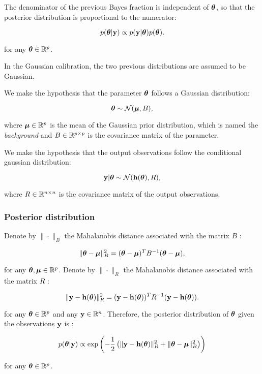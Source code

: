 \documentclass[aspectratio=169]{beamer}
\begin{document}
\begin{frame}

The denominator of the previous Bayes fraction is independent of
$\boldsymbol{\theta}$, so that the posterior distribution is
proportional to the numerator:

$$
p(\boldsymbol{\theta} | {\bf y}) \propto  p({\bf y} | \boldsymbol{\theta}) p(\boldsymbol{\theta}).
$$

for any $\boldsymbol{\theta}\in\mathbb{R}^p$.

\vspace{15pt}

In the Gaussian calibration, the two previous distributions are assumed
to be Gaussian.

We make the hypothesis that the parameter
$\boldsymbol{\theta}$ follows a Gaussian distribution:

$$
\boldsymbol{\theta} \sim \mathcal{N}(\boldsymbol{\mu}, B),
$$

where $\boldsymbol{\mu}\in\mathbb{R}^p$ is the mean of the Gaussian prior
distribution, which is named the \emph{background} and
$B\in\mathbb{R}^{p \times p}$ is the covariance matrix of the
parameter.

\end{frame}

\begin{frame}
We make the hypothesis that the output observations follow the
conditional gaussian distribution:

$$
{\bf y} | \boldsymbol{\theta} \sim \mathcal{N}({\bf h}(\boldsymbol{\theta}), R),
$$

where $R\in\mathbb{R}^{n \times n}$ is the covariance matrix of the
output observations.
\end{frame}


\begin{frame}
\frametitle{Posterior distribution}

Denote by $\|\cdot\|_B$ the Mahalanobis distance associated with
the matrix $B$ :

$$
\|\boldsymbol{\theta}-\boldsymbol{\mu} \|^2_B = (\boldsymbol{\theta}-\boldsymbol{\mu} )^T B^{-1} (\boldsymbol{\theta}-\boldsymbol{\mu} ),
$$

for any $\boldsymbol{\theta},\boldsymbol{\mu} \in \mathbb{R}^p$. Denote by
$\|\cdot\|_R$ the Mahalanobis distance associated with the matrix
$R$ :

$$
\|{\bf y}-{\bf h}(\boldsymbol{\theta})\|^2_R = ({\bf y}-{\bf h}(\boldsymbol{\theta}))^T R^{-1} ({\bf y}-{\bf h}(\boldsymbol{\theta})).
$$

for any $\boldsymbol{\theta} \in \mathbb{R}^p$ and any
${\bf y} \in \mathbb{R}^{n}$. Therefore, the posterior distribution
of $\boldsymbol{\theta}$ given the observations ${\bf y}$ is :

$$
   p(\boldsymbol{\theta}|{\bf y}) \propto \exp\left( -\frac{1}{2} \left( \|{\bf y}-{\bf h}(\boldsymbol{\theta})\|^2_R 
   + \|\boldsymbol{\theta}-\boldsymbol{\mu} \|^2_B \right) \right)
$$

for any $\boldsymbol{\theta}\in\mathbb{R}^p$.
\end{frame}
\end{document}
